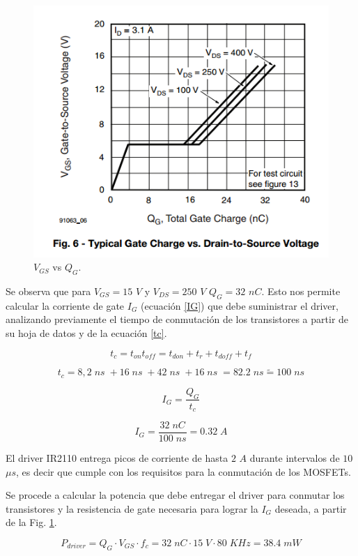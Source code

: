 \documentclass[11pt, a4paper]{article}
\begin{document}
\begin{figure}[h]
	\centering
	\includegraphics[width = 10 cm]{Imagenes/vgsfqg}
	\caption{$V_{GS}$ vs $Q_G$.}
	\label{vgsfqg}
\end{figure}

Se observa que para $V_{GS} = 15$ $V$ y $V_{DS} = 250$ $V$ $Q_G = 32$ $nC$. Esto nos permite calcular la corriente de gate $I_G$ (ecuación \ref{IG}) que debe suministrar el driver, analizando previamente el tiempo de conmutación de los transistores a partir de su hoja de datos y de la ecuación \ref{tc}.

\begin{equation}
t_c = t_{on} t_{off} = t_{don} + t_{r} + t_{doff} + t_f
\label{tc} 
\end{equation}

\[ t_c = 8,2 \; ns\; + 16 \; ns\; + 42 \; ns\; + 16 \; ns\; = 82.2 \; ns \tilde{=} 100 \; ns \]

\begin{equation}
I_G = \frac{Q_G}{t_c} 
\label{IG} 
\end{equation}

\[ I_G = \frac{32 \; nC}{100 \; ns} = 0.32 \; A \]

El driver IR2110 entrega picos de corriente de hasta $2$ $A$ durante intervalos de $10$ $\mu s$, es decir que cumple con los requisitos para la conmutación de los MOSFETs.

Se procede a calcular la potencia que debe entregar el driver para conmutar los transistores y la resistencia de gate necesaria para lograr la $I_G$ deseada, a partir de la Fig. \ref{vgsfqg}.

\[ P_{driver} = Q_G \cdot V_{GS} \cdot f_c = 32 \; nC \cdot 15 \; V \cdot 80 \; KHz = 38.4 \; mW \]
\end{document}
